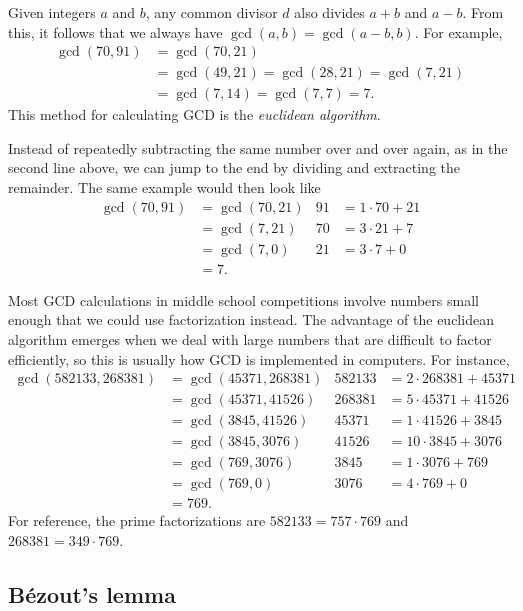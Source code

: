 Given integers $a$ and $b$, any common divisor $d$ also divides $a + b$ and $a - b$. From this, it follows that we always have $\gcd(a,b) = \gcd(a - b, b)$. For example,
\begin{align*}
\gcd(70,91) &= \gcd(70,21) \\
&= \gcd(49,21) = \gcd(28,21) = \gcd(7,21) \\
&= \gcd(7,14) = \gcd(7,7) = \boxed{7}.
\end{align*}
This method for calculating GCD is the \emph{euclidean algorithm}.

Instead of repeatedly subtracting the same number over and over again, as in the second line above, we can jump to the end by dividing and extracting the remainder. The same example would then look like
\begin{align*}
\gcd(70,91) &= \gcd(70,21) & 91 &= 1\cdot 70 + 21 \\
&= \gcd(7,21) & 70 &= 3\cdot 21 + 7 \\
&= \gcd(7,0) & 21 &= 3\cdot 7 + 0 \\
&= \boxed{7}.
\end{align*}

\begin{remark}
Most GCD calculations in middle school competitions involve numbers small enough that we could use factorization instead. The advantage of the euclidean algorithm emerges when we deal with large numbers that are difficult to factor efficiently, so this is usually how GCD is implemented in computers. For instance,
\begin{align*}
\gcd(582133, 268381) &= \gcd(45371, 268381) & 582133 &= 2\cdot 268381 + 45371 \\
&= \gcd(45371, 41526) & 268381 &= 5\cdot 45371 + 41526 \\
&= \gcd(3845, 41526) & 45371 &= 1\cdot 41526 + 3845 \\
&= \gcd(3845, 3076) & 41526 &= 10\cdot 3845 + 3076 \\
&= \gcd(769, 3076) & 3845 &= 1\cdot 3076 + 769 \\
&= \gcd(769, 0) & 3076 &= 4\cdot 769 + 0 \\
&= \boxed{769}.
\end{align*}
For reference, the prime factorizations are $582133 = 757\cdot 769$ and $268381 = 349\cdot 769$.
\end{remark}


\subsection{B\'{e}zout's lemma}

